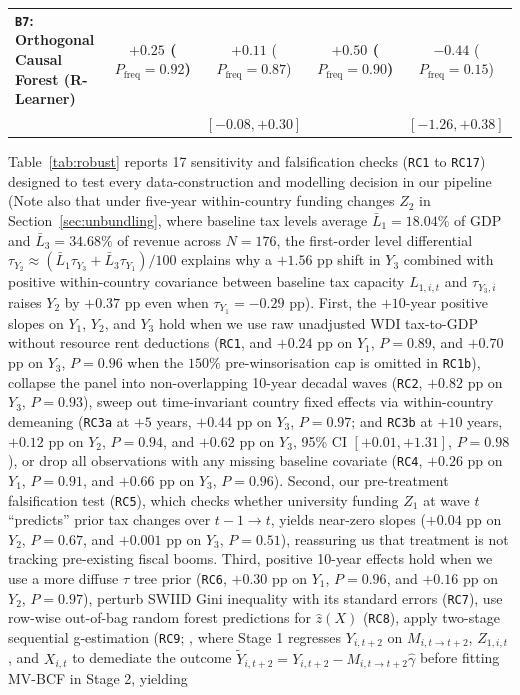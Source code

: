 \documentclass[11pt,a4paper]{article}
\newcommand{\co}{\cellcolor{colodd}}
\begin{document}
\begin{table}[htbp]
{\begin{tabular}{l|c|c|c|c}
    \hline
    \rowcolor{rowodd}
    \textbf{\texttt{B7}: Orthogonal Causal Forest (R-Learner)} & \co \textbf{$+0.25$ ($P_{\text{freq}}=0.92$)} & $+0.11$ ($P_{\text{freq}}=0.87$) & \co \textbf{$+0.50$ ($P_{\text{freq}}=0.90$)} & $-0.44$ ($P_{\text{freq}}=0.15$) \\
    \rowcolor{rowodd}
                                                                & \co {\scriptsize $[-0.11, +0.62]$} & {\scriptsize $[-0.08, +0.30]$} & \co {\scriptsize $[-0.26, +1.26]$} & {\scriptsize $[-1.26, +0.38]$} \\
    \bottomrule
  \end{tabular}%
  }
\end{table}

Table~\ref{tab:robust} reports 17 sensitivity and falsification checks (\texttt{RC1} to \texttt{RC17}) designed to test every data-construction and modelling decision in our pipeline (Note also that under five-year within-country funding changes $Z_2$ in Section~\ref{sec:unbundling}, where baseline tax levels average $\bar{L}_1 = 18.04\%$ of GDP and $\bar{L}_3 = 34.68\%$ of revenue across $N = 176$, the first-order level differential $\tau_{Y_2} \approx (\bar{L}_1 \tau_{Y_3} + \bar{L}_3 \tau_{Y_1}) / 100$ explains why a $+1.56$ pp shift in $Y_3$ combined with positive within-country covariance between baseline tax capacity $L_{1,i,t}$ and $\tau_{Y_3,i}$ raises $Y_2$ by $+0.37$ pp even when $\tau_{Y_1} = -0.29$ pp). First, the $+10$-year positive slopes on $Y_1$, $Y_2$, and $Y_3$ hold when we use raw unadjusted WDI tax-to-GDP without resource rent deductions (\texttt{RC1}, and $+0.24$ pp on $Y_1$, $P = 0.89$, and $+0.70$ pp on $Y_3$, $P = 0.96$ when the $150\%$ pre-winsorisation cap is omitted in \texttt{RC1b}), collapse the panel into non-overlapping 10-year decadal waves (\texttt{RC2}, $+0.82$ pp on $Y_3$, $P = 0.93$), sweep out time-invariant country fixed effects via within-country demeaning (\texttt{RC3a} at $+5$ years, $+0.44$ pp on $Y_3$, $P = 0.97$; and \texttt{RC3b} at $+10$ years, $+0.12$ pp on $Y_2$, $P = 0.94$, and $+0.62$ pp on $Y_3$, 95\% CI $[+0.01, +1.31]$, $P = 0.98$), or drop all observations with any missing baseline covariate (\texttt{RC4}, $+0.26$ pp on $Y_1$, $P = 0.91$, and $+0.66$ pp on $Y_3$, $P = 0.96$). Second, our pre-treatment falsification test (\texttt{RC5}), which checks whether university funding $Z_1$ at wave $t$ ``predicts'' prior tax changes over $t-1 \to t$, yields near-zero slopes ($+0.04$ pp on $Y_2$, $P = 0.67$, and $+0.001$ pp on $Y_3$, $P = 0.51$), reassuring us that treatment is not tracking pre-existing fiscal booms. Third, positive 10-year effects hold when we use a more diffuse $\tau$ tree prior (\texttt{RC6}, $+0.30$ pp on $Y_1$, $P = 0.96$, and $+0.16$ pp on $Y_2$, $P = 0.97$), perturb SWIID Gini inequality with its standard errors (\texttt{RC7}), use row-wise out-of-bag random forest predictions for $\hat{z}(X)$ (\texttt{RC8}), apply two-stage sequential g-estimation (\texttt{RC9}; \citealt{acharya2016explaining}, where Stage 1 regresses $Y_{i,t+2}$ on $M_{i,t\to t+2}$, $Z_{1,i,t}$, and $X_{i,t}$ to demediate the outcome $\tilde{Y}_{i,t+2} = Y_{i,t+2} - M_{i,t\to t+2}\hat{\gamma}$ before fitting MV-BCF in Stage 2, yielding 
\end{document}
